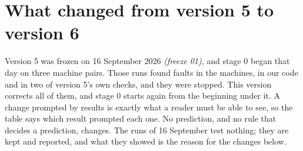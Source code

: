 \documentclass[11pt]{article}
\newcommand{\gl}[1]{{\color{soft}\itshape\small (#1)}}
\begin{document}
\section*{What changed from version 5 to version 6}
Version 5 was frozen on 16 September 2026 \gl{freeze 01}, and stage 0 began that day on three machine pairs. Those runs found faults in the machines, in our code and in two of version 5's own checks, and they were stopped. This version corrects all of them, and stage 0 starts again from the beginning under it. A change prompted by results is exactly what a reader must be able to see, so the table says which result prompted each one. No prediction, and no rule that decides a prediction, changes. The runs of 16 September test nothing; they are kept and reported, and what they showed is the reason for the changes below.
\end{document}

